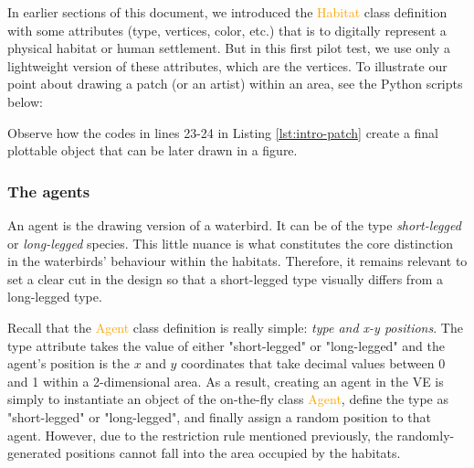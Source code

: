 In earlier sections of this document, we introduced the \textcolor{orange}{Habitat} class definition with some attributes (type, vertices, color, etc.) that is to digitally represent a physical habitat or human settlement. But in this first pilot test, we use only a lightweight version of these attributes, which are the vertices. To illustrate our point about drawing a patch (or an artist) within an area, see the Python scripts below:



\noindent
Observe how the codes in lines 23-24 in Listing \ref{lst:intro-patch} create a final plottable object that can be later drawn in a figure.

\subsubsection{The agents}
An agent is the drawing version of a waterbird. It can be of the type \emph{short-legged} or \emph{long-legged} species. This little nuance is what constitutes the core distinction in the waterbirds' behaviour within the habitats. Therefore, it remains relevant to set a clear cut in the design so that a short-legged type visually differs from a long-legged type.

Recall that the \textcolor{orange}{Agent} class definition is really simple: \emph{type and x-y positions}. The type attribute takes the value of either "short-legged" or "long-legged" and the agent's position is the $x$ and $y$ coordinates that take decimal values between 0 and 1 within a 2-dimensional area. As a result, creating an agent in the VE is simply to instantiate an object of the on-the-fly class \textcolor{orange}{Agent}, define the type as "short-legged" or "long-legged", and finally assign a random position to that agent. However, due to the restriction rule mentioned previously, the randomly-generated positions cannot fall into the area occupied by the habitats.


